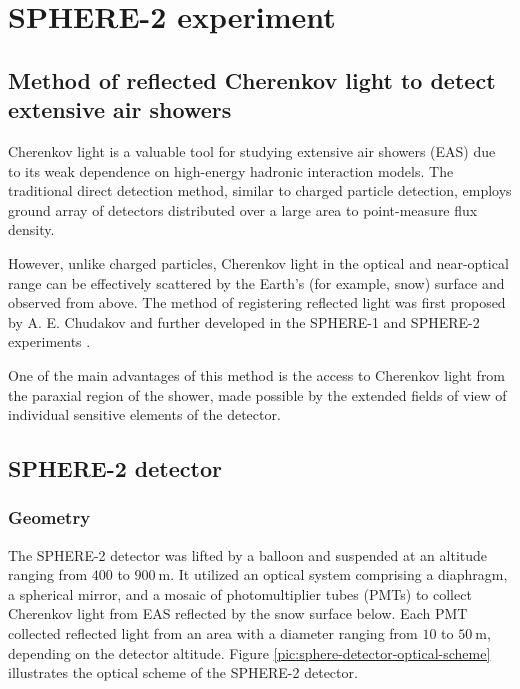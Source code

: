 \chapter{SPHERE-2 experiment}

\section{Method of reflected Cherenkov light to detect extensive air showers}

Cherenkov light is a valuable tool for studying extensive air showers (EAS) due to its weak dependence on high-energy hadronic interaction models. The traditional direct detection method, similar to charged particle detection, employs ground array of detectors distributed over a large area to point-measure flux density.

However, unlike charged particles, Cherenkov light in the optical and near-optical range can be effectively scattered by the Earth's (for example, snow) surface and observed from above. The method of registering reflected light was first proposed by A. E. Chudakov \cite{Chudakov1972} and further developed in the SPHERE-1 and SPHERE-2 experiments \cite{Antonov1997, Antonov2001}.

One of the main advantages of this method is the access to Cherenkov light from the paraxial region of the shower, made possible by the extended fields of view of individual sensitive elements of the detector.

\section{SPHERE-2 detector}
\label{sec:sphere-2-model}

\subsection{Geometry}
\label{sec:light-collection-from-surface}

The SPHERE-2 detector was lifted by a balloon and suspended at an altitude ranging from $400$ to $900~\text{m}$. It utilized an optical system comprising a diaphragm, a spherical mirror, and a mosaic of photomultiplier tubes (PMTs) to collect Cherenkov light from EAS reflected by the snow surface below. Each PMT collected reflected light from an area with a diameter ranging from $10$ to $50~\text{m}$, depending on the detector altitude. Figure \ref{pic:sphere-detector-optical-scheme} illustrates the optical scheme of the SPHERE-2 detector.

